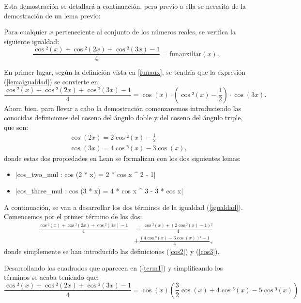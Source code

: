 Esta demostración se detallará a continuación, pero previo a
ella se necesita de la demostración de un lema previo:

\begin{lema}[Igualdad]\label{igualdadlema}
  Para cualquier \(x\) perteneciente al conjunto de los
  números reales, se verifica la siguiente igualdad:
  \begin{equation}\label{lemaigualdad}
    \frac{\cos²(x)+\cos²(2x)+\cos²(3x)-1}{4}=\text{funauxiliar}(x).
  \end{equation}
\end{lema}
\begin{demostracion}
  En primer lugar, según la definición vista en \ref{funaux}, se
  tendría que la expresión (\ref{lemaigualdad}) se convierte en:
  \begin{equation}\label{igualdad}
    \frac{\cos²(x)+\cos²(2x)+\cos²(3x)-1}{4}=
    \cos(x)·(\cos²(x)-\frac{1}{2})·\cos(3x).
  \end{equation}
  Ahora bien, para llevar a cabo la demostración comenzaremos
  introduciendo las conocidas definiciones del coseno del
  ángulo doble y del coseno del ángulo triple, que son:
  \begin{align}
    & \cos(2x)=2\cos²(x)-\frac{1}{2}\label{cos2}\\
    & \cos(3x)=4\cos³(x)-3\cos(x)\label{cos3},
  \end{align}
  donde estas dos propiedades en Lean se formalizan con los
  dos siguientes lemas:
  \begin{itemize}
\item {}|cos_two_mul : cos (2 * x) = 2 * cos x ^ 2 - 1|
\item {}|cos_three_mul : cos (3 * x) = 4 * cos x ^ 3 - 3 * cos x|
\end{itemize}

A continuación, se van a desarrollar los dos términos de la
igualdad (\ref{igualdad}). Comencemos por el primer término
de los dos:
\begin{align}\label{term1}
  \frac{\cos²(x)+\cos²(2x)+\cos²(3x)-1}{4}&=\frac{\cos²(x)+(2\cos²(x)-1)²}{4}\\
  &+\frac{(4\cos³(x)-3\cos(x))²-1}{4},
\end{align}
donde simplemente se han introducido las definiciones (\ref{cos2})
y (\ref{cos3}).

Desarrollando los cuadrados que aparecen en (\ref{term1}) y
simplificando los términos se acaba teniendo que:
\begin{equation}\label{term11}
  \frac{\cos²(x)+\cos²(2x)+\cos²(3x)-1}{4}=
  \cos(x)(\frac{3}{2}\cos(x)+4\cos⁵(x)-5\cos³(x))
\end{equation}


\end{demostracion}
